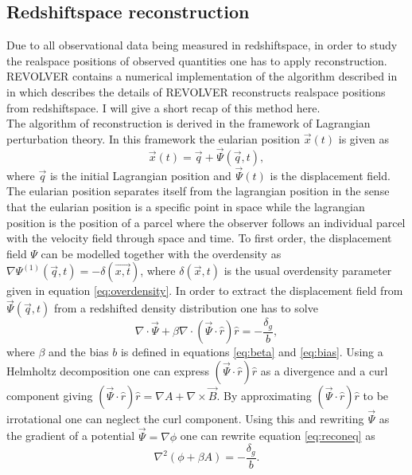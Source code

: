 \subsection{Redshiftspace reconstruction}\label{sec:reconstruction}
Due to all observational data being measured in redshiftspace, in order to study
the realspace positions of observed quantities one has to apply reconstruction. REVOLVER contains a numerical implementation of
the algorithm described in \cite{Nadathur_2018} in which describes the details
of REVOLVER reconstructs realspace positions from redshiftspace. I will give a
short recap of this method here.\\\indent
The algorithm of reconstruction is derived in the framework of Lagrangian
perturbation theory. In this framework the eularian position $\vec{x}(t)$ is
given as
\begin{equation}
    \vec{x}(t)=\vec{q}+\vec{\Psi}(\vec{q},t),
\end{equation}
where $\vec{q}$ is the initial Lagrangian position and $\vec{\Psi}(t)$ is the
displacement field. The eularian position separates itself from the lagrangian
position in the sense that the eularian position is a specific point in space
while the lagrangian position is the position of a parcel where the observer
follows an individual parcel with the velocity field through space and time.
To first order, the displacement field $\Psi$ can be modelled together with the
overdensity as $\nabla\Psi^{(1)}(\vec{q},t)=-\delta(\vec{x,t})$, where
$\delta(\vec{x},t)$ is the usual overdensity parameter given in equation \ref{eq:overdensity}.
In order to extract the displacement field from $\vec{\Psi}(\vec{q},t)$ from a
redshifted density distribution one has to solve \cite{recondisplace}
\begin{equation}\label{eq:reconeq}
    \nabla\cdot\vec{\Psi}+\beta\nabla\cdot(\vec{\Psi}\cdot\hat{r})\hat{r}=-\frac{\delta_g}{b},
\end{equation}
where $\beta$ and the bias $b$ is defined in equations
\ref{eq:beta} and \ref{eq:bias}. Using a Helmholtz decomposition one can
express $(\vec{\Psi}\cdot\hat{r})\hat{r}$ as a divergence and a curl component giving $(\vec{\Psi}\cdot\hat{r})\hat{r}=\nabla A + \nabla \times \vec{B}$.
By approximating $(\vec{\Psi}\cdot\hat{r})\hat{r}$ to be irrotational one can neglect
the curl component.
Using this and rewriting $\vec{\Psi}$ as the gradient of a
potential $\vec{\Psi}=\nabla\phi$ one can rewrite equation \ref{eq:reconeq} as
\begin{equation}
    \nabla^2(\phi+\beta A)=-\frac{\delta_g}{b}.
\end{equation}
